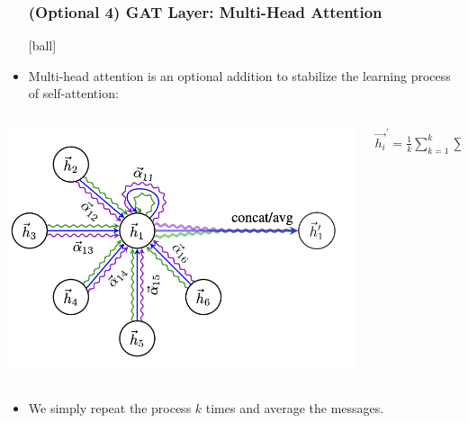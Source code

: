\documentclass{beamer}
\begin{document}
\begin{frame}[fragile]
\begin{itemize}
\frametitle{(Optional 4) GAT Layer: Multi-Head Attention}
[ball]

\item Multi-head attention is an optional addition to stabilize the learning process of self-attention:

\end{itemize}

\begin{columns}
\begin{column}{0.5\textwidth}
\begin{minipage}[c]{\linewidth}
\vspace{0.5cm}
\hspace{0.5cm}
\includegraphics[width=1\linewidth]{GNN/imgs/multi-head.png}
\end{minipage}
\end{column}
\begin{column}{0.6\textwidth}
\begin{center}
    $\overrightarrow{h_{i}}^{'} = \frac{1}{k} \sum_{k=1}^{k} \sum_{j \in \mathcal{N}_{i}} \alpha_{i,j} \textbf{W}\overrightarrow{h_{j}}$ 
\end{center}
\end{column}
\end{columns}

\vspace{0.3cm}

\begin{itemize}
    \item We simply repeat the process $k$ times and average the messages.
\end{itemize}

\end{frame}
\end{document}

